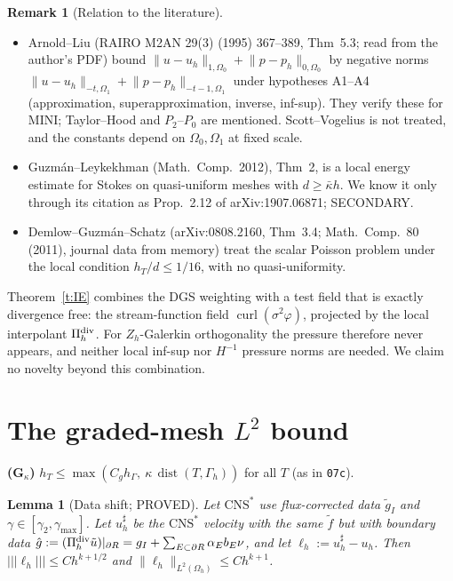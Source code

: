 \documentclass[11pt,reqno]{amsart}
\theoremstyle{plain}
\newtheorem{lemma}[theorem]{Lemma}
\theoremstyle{definition}
\newtheorem{remark}[theorem]{Remark}
\newcommand{\hG}{h_\Gamma}
\newcommand{\Gh}{\Gamma_h}
\newcommand{\Oh}{\Omega_h}
\newcommand{\Zh}{Z_h}
\newcommand{\gI}{g_I}
\newcommand{\ut}{\tilde u}
\newcommand{\ft}{\tilde f}
\newcommand{\tnorm}[1]{|\!|\!|#1|\!|\!|}
\newcommand{\norm}[1]{\lVert #1\rVert}
\newcommand{\CNS}{\mathrm{CNS}^\ast}
\newcommand{\curl}{\operatorname{curl}}
\DeclareMathOperator{\dist}{dist}
\newcommand{\Pz}{\Pi^{\rm div}_h}   %
\begin{document}
\begin{remark}[Relation to the literature]\label{r:lit}
\begin{itemize}
\item Arnold--Liu (RAIRO M2AN 29(3) (1995) 367--389, Thm~5.3; read from the author's PDF) bound $\norm{u-u_h}_{1,\Omega_0}+\norm{p-p_h}_{0,\Omega_0}$ by negative norms $\norm{u-u_h}_{-t,\Omega_1}+\norm{p-p_h}_{-t-1,\Omega_1}$ under hypotheses A1--A4 (approximation, superapproximation, inverse, inf-sup). They verify these for MINI; Taylor--Hood and $P_2$--$P_0$ are mentioned. Scott--Vogelius is not treated, and the constants depend on $\Omega_0,\Omega_1$ at fixed scale.
\item Guzm\'an--Leykekhman (Math.\ Comp.\ 2012), Thm~2, is a local energy estimate for Stokes on quasi-uniform meshes with $d\ge\bar\kappa h$. We know it only through its citation as Prop.~2.12 of arXiv:1907.06871; SECONDARY.
\item Demlow--Guzm\'an--Schatz (arXiv:0808.2160, Thm~3.4; Math.\ Comp.\ 80 (2011), journal data from memory) treat the scalar Poisson problem under the local condition $h_T/d\le1/16$, with no quasi-uniformity.
\end{itemize}
Theorem~\ref{t:IE} combines the DGS weighting with a test field that is exactly divergence free: the stream-function field $\curl(\sigma^2\varphi)$, projected by the local interpolant $\Pz$. For $\Zh$-Galerkin orthogonality the pressure therefore never appears, and neither local inf-sup nor $H^{-1}$ pressure norms are needed. We claim no novelty beyond this combination.
\end{remark}

\section{The graded-mesh \texorpdfstring{$L^2$}{L2} bound}\label{s:G}

\noindent\textbf{(G$_\kappa$)} $h_T\le\max(C_g\hG,\ \kappa\,\dist(T,\Gh))$ for all $T$ (as in \texttt{07c}).

\begin{lemma}[Data shift; PROVED]\label{l:shift}
Let $\CNS$ use flux-corrected data $\tilde g_I$ and $\gamma\in[\gamma_2,\gamma_{\max}]$. Let $u_h^\sharp$ be the $\CNS$ velocity with the same $\ft$ but with boundary data $\hat g:=(\Pz\ut)|_{\partial R}=\gI+\sum_{E\subset\partial R}\alpha_Eb_E\nu$, and let $\ell_h:=u_h^\sharp-u_h$. Then $\tnorm{\ell_h}\le Ch^{k+1/2}$ and $\norm{\ell_h}_{L^2(\Oh)}\le Ch^{k+1}$.
\end{lemma}
\end{document}
